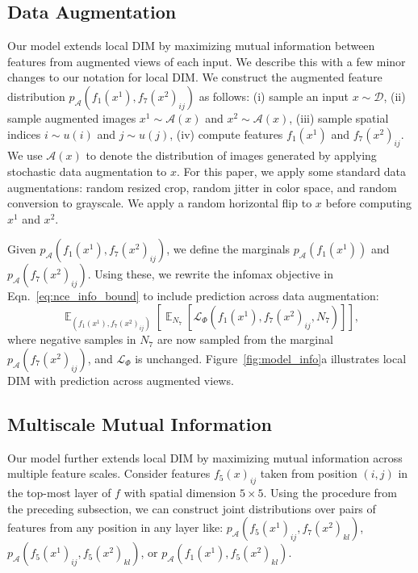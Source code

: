 \documentclass{article}
\newcommand{\AAA}{\mathcal{A}}
\newcommand{\DD}{\mathcal{D}}
\newcommand{\LL}{\mathcal{L}}
\DeclareMathOperator*{\expect}{\mathbb{E}}
\begin{document}
\subsection{Data Augmentation}
\label{sec:dim_with_aug}
Our model extends local DIM by maximizing mutual information between features from augmented views of each input. We describe this with a few minor changes to our notation for local DIM.
We construct the augmented feature distribution $p_{\AAA}(f_1(x^1), f_7(x^2)_{ij})$ as follows: (i) sample an input $x \sim \DD$, (ii) sample augmented images $x^1 \sim \AAA(x)$ and $x^2 \sim \AAA(x)$, (iii) sample spatial indices $i \sim u(i)$ and $j \sim u(j)$, (iv) compute features $f_1(x^1)$ and $f_7(x^2)_{ij}$.
We use $\AAA(x)$ to denote the distribution of images generated by applying stochastic data augmentation to $x$.
For this paper, we apply some standard data augmentations: random resized crop, random jitter in color space, and random conversion to grayscale.
We apply a random horizontal flip to $x$ before computing $x^1$ and $x^2$.

Given $p_{\AAA}(f_1(x^1), f_7(x^2)_{ij})$, we define the marginals $p_{\AAA}(f_1(x^1))$ and $p_{\AAA}(f_7(x^2)_{ij})$.
Using these, we rewrite the infomax objective in Eqn.~\ref{eq:nce_info_bound} to include prediction across data augmentation:
\begin{equation}
\expect_{(f_1(x^1), f_7(x^2)_{ij})} \left[ \expect_{N_7} \left[ \LL_{\Phi}(f_1(x^1), f_7(x^2)_{ij}, N_7) \right] \right],
\label{eq:nce_info_bound_aug}
\end{equation}
where negative samples in $N_7$ are now sampled from the marginal $p_{\AAA}(f_7(x^2)_{ij})$, and $\LL_{\Phi}$ is unchanged. Figure~\ref{fig:model_info}a illustrates local DIM with prediction across augmented views.

\subsection{Multiscale Mutual Information}
Our model further extends local DIM by maximizing mutual information across multiple feature scales.
Consider features $f_5(x)_{ij}$ taken from position $(i,j)$ in the top-most layer of $f$ with spatial dimension $5 \times 5$.
Using the procedure from the preceding subsection, we can construct joint distributions over pairs of features from any position in any layer like: $p_{\AAA}(f_5(x^1)_{ij}, f_7(x^2)_{kl})$, $p_{\AAA}(f_5(x^1)_{ij}, f_5(x^2)_{kl})$, or $p_{\AAA}(f_1(x^1), f_5(x^2)_{kl})$.
\end{document}

